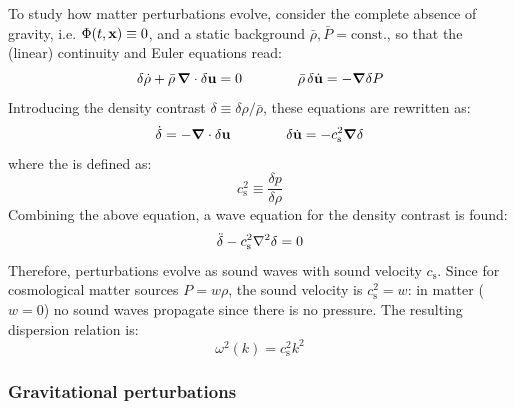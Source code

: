 To study how matter perturbations evolve, consider the complete absence of gravity, i.e. $ \Phi(t,\mathbf{x}) \equiv 0 $, and a static background $ \bar \rho, \bar P = \text{const.} $, so that the (linear) continuity and Euler equations read:
\begin{equation*}
  \delta \dot \rho + \bar \rho \, \boldsymbol{\nabla}\cdot \delta \mathbf{u} = 0
  \qquad \qquad
  \bar \rho \, \delta \dot{\mathbf{u}} = - \boldsymbol{\nabla} \delta P
\end{equation*}
Introducing the density contrast $ \delta \equiv \delta \rho / \bar \rho $, these equations are rewritten as:
\begin{equation*}
  \dot{\delta} = - \boldsymbol{\nabla}\cdot \delta \mathbf{u}
  \qquad \qquad
  \delta \dot{\mathbf{u}} = - c_\text{s}^2 \boldsymbol{\nabla} \delta
\end{equation*}
where the  is defined as:
\begin{equation}
  c_\text{s}^2 \equiv \frac{\delta p}{\delta \rho}
\end{equation}
Combining the above equation, a wave equation for the density contrast is found:
\begin{equation}
  \ddot{\delta} - c_\text{s}^2 \nabla^2 \delta = 0
\end{equation}
Therefore, perturbations evolve as sound waves with sound velocity $ c_\text{s} $. Since for cosmological matter sources $ P = w \rho $, the sound velocity is $ c_\text{s}^2 = w $: in matter ($ w = 0 $) no sound waves propagate since there is no pressure. The resulting dispersion relation is:
\begin{equation}
  \omega^2(k) = c_\text{s}^2 k^2
\end{equation}

\subsubsection{Gravitational perturbations}

